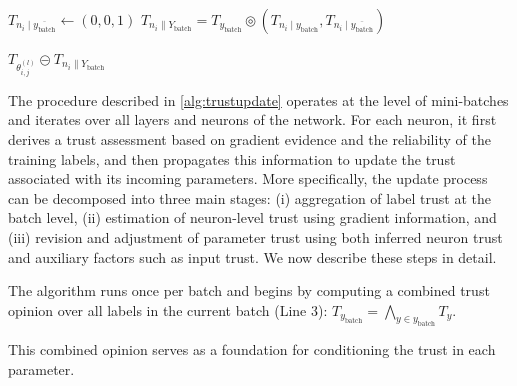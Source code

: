 \begin{algorithm}
\begin{algorithmic}[1]
        \State $T_{n_i \mid \overline{y_\text{batch}}}  \longleftarrow  (0,0,1)$
        \State \Return $T_{n_i \parallel Y_\text{batch}} = T_{y_\text{batch}} \circledcirc (T_{n_i \mid y_\text{batch}}, T_{n_i \mid \overline{y_\text{batch}}})$
    \EndFunction

        \State \Return $T_{\theta_{i,j}^{(l)}} \circleddash T_{n_i \parallel Y_\text{batch}}$
    \EndFunction

\end{algorithmic}
\label{alg:trustupdate}
\end{algorithm}
The procedure described in \cref{alg:trustupdate} operates at the level of mini-batches and iterates over all layers and neurons of the network. For each neuron, it first derives a trust assessment based on gradient evidence and the reliability of the training labels, and then propagates this information to update the trust associated with its incoming parameters. More specifically, the update process can be decomposed into three main stages: (i) aggregation of label trust at the batch level, (ii) estimation of neuron-level trust using gradient information, and (iii) revision and adjustment of parameter trust using both inferred neuron trust and auxiliary factors such as input trust. We now describe these steps in detail.

The algorithm runs once per batch and begins by computing a combined trust opinion over all labels in the current batch (Line 3):
\(
T_{y_\text{batch}} = \bigwedge_{y \in y_\text{batch}} T_y
\).

This combined opinion serves as a foundation for conditioning the trust in each parameter.

